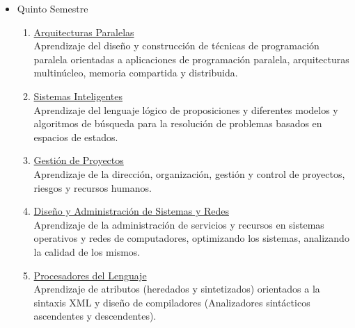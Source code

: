 \begin{itemize}
\item Quinto Semestre
\begin{enumerate}
\item \underline{Arquitecturas Paralelas}\\Aprendizaje del diseño y construcción de técnicas de programación paralela orientadas a aplicaciones de programación paralela, arquitecturas multinúcleo, memoria compartida y distribuida. 
\item \underline{Sistemas Inteligentes}\\Aprendizaje del lenguaje lógico de proposiciones y diferentes modelos y algoritmos de búsqueda para la resolución de  problemas basados en espacios de estados.
\item \underline{Gestión de Proyectos}\\Aprendizaje de la dirección, organización, gestión y control de proyectos, riesgos y recursos humanos. 
\item \underline{Diseño y Administración de Sistemas y Redes}\\Aprendizaje de la administración de servicios y recursos en sistemas operativos y redes de computadores, optimizando los sistemas, analizando la calidad de los mismos. 
\item \underline{Procesadores del Lenguaje}\\Aprendizaje de atributos (heredados y sintetizados) orientados a la sintaxis XML y  diseño de compiladores (Analizadores sintácticos ascendentes y descendentes).
\end{enumerate}
\end{itemize}
